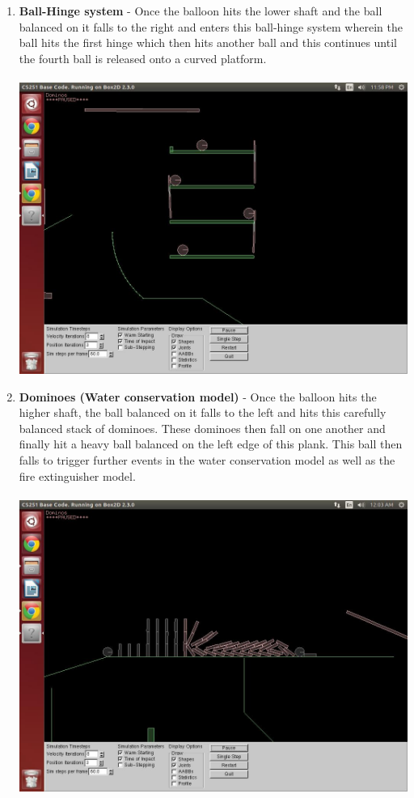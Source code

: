 \documentclass{report}
\begin{document}
\begin{enumerate}
\item \textbf{Ball-Hinge system} - Once the balloon hits the lower shaft and the ball balanced on it falls to the right and enters this ball-hinge system wherein the ball hits the first hinge which then hits another ball and this continues until the fourth ball is released onto a curved platform.\\\\
\includegraphics[scale=0.25]{pics/BallHingeSystem}
\item \textbf{Dominoes (Water conservation model)} - Once the balloon hits the higher shaft, the ball balanced on it falls to the left and hits this carefully balanced stack of dominoes. These dominoes then fall on one another and finally hit a heavy ball balanced on the left edge of this plank. This ball then falls to trigger further events in the water conservation model as well as the fire extinguisher model.\\\\
\includegraphics[scale=0.25]{pics/TopDominoMechanism}
\pagebreak


\end{enumerate}
\end{document}
